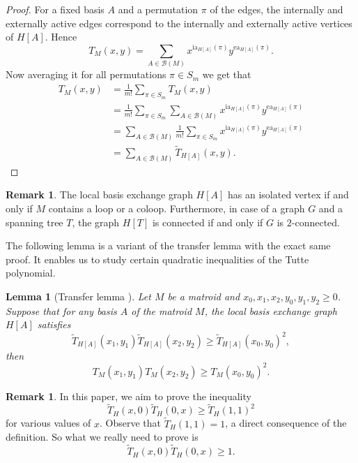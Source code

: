 \documentclass[12pt,a4paper]{amsart}
\numberwithin{equation}{section}
\theoremstyle{plain}
\newtheorem{Lemma}[Th]{Lemma}
\theoremstyle{definition}
\newtheorem{Rem}[Th]{Remark}
\newcommand{\1}{\textbf{1}}
\newcommand{\ia}{\mathrm{ia}}
\newcommand{\ea}{\mathrm{ea}}
\begin{document}
\begin{proof}
For a fixed basis $A$ and a permutation $\pi$ of the edges, the internally and externally active edges correspond to the internally and externally active vertices of $H[A]$. Hence
$$T_M(x,y)=\sum_{A\in \mathcal{B}(M)}x^{\ia_{H[A]}(\pi)}y^{\ea_{H[A]}(\pi)}.$$
Now averaging it for all permutations $\pi \in S_m$ we get that
\begin{align*}
T_M(x,y)&=\frac{1}{m!}\sum_{\pi \in S_m}T_M(x,y)\\
&=\frac{1}{m!}\sum_{\pi \in S_m}\sum_{A\in \mathcal{B}(M)}x^{\ia_{H[A]}(\pi)}y^{\ea_{H[A]}(\pi)}\\
&=\sum_{A\in \mathcal{B}(M)}\frac{1}{m!}\sum_{\pi \in S_m}x^{\ia_{H[A]}(\pi)}y^{\ea_{H[A]}(\pi)}\\
&=\sum_{A\in \mathcal{B}(M)}\widetilde{T}_{H[A]}(x,y).
\end{align*}

\end{proof}

\begin{Rem}
The local basis exchange graph $H[A]$ has an isolated vertex if and only if $M$ contains a loop or a coloop. Furthermore, in case of a graph $G$ and a spanning tree $T$, the graph $H[T]$ is connected if and only if $G$ is $2$-connected.
\end{Rem}

The following lemma is a variant of the transfer lemma \cite{beke2024permutation} with the exact same proof.  It enables us to study certain quadratic inequalities of the Tutte polynomial.

\begin{Lemma}[Transfer lemma \cite{beke2024permutation}] \label{quadratic-connection}
Let $M$ be a matroid and $x_0,x_1,x_2,y_0,y_1,y_2\geqslant0$. Suppose that 
for any basis $A$ of the matroid $M$, the local basis exchange graph $H[A]$ satisfies 
$$\widetilde{T}_{H[A]}(x_1,y_1)\widetilde{T}_{H[A]}(x_2,y_2)\geqslant \widetilde{T}_{H[A]}(x_0,y_0)^2,$$
then
$$T_M(x_1,y_1)T_M(x_2,y_2)\geqslant T_M(x_0,y_0)^2.$$
\end{Lemma}

\begin{Rem} In this paper, we aim to prove the inequality
$$\widetilde{T}_{H}(x,0)\widetilde{T}_{H}(0,x)\geqslant \widetilde{T}_{H}(1,1)^2$$
for various values of $x$. Observe that
$\widetilde{T}_{H}(1,1)=1$, a direct consequence of the definition. So what we really need to prove is 
$$\widetilde{T}_{H}(x,0)\widetilde{T}_{H}(0,x)\geqslant 1.$$


\end{Rem}
\end{document}
